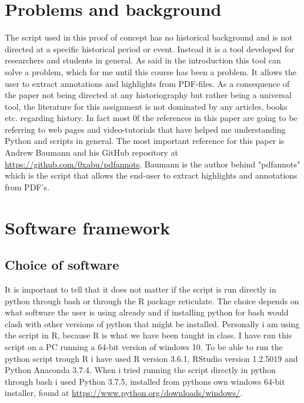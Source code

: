 \documentclass{article}
\begin{document}
\section{Problems and background}

The script used in this proof of concept has no historical background and is not directed at a specific historical period or event. Instead it is a tool developed for researchers and students in general. As said in the introduction this tool can solve a problem, which for me until this course has been a problem. It allows the user to extract annotations and highlights from PDF-files.
As a consequence of the paper not being directed at any historiography but rather being a universal tool, the literature for this assignment is not dominated by any articles, books etc. regarding history. In fact most 0f the references in this paper are going to be referring to web pages and video-tutorials that have helped me understanding Python and scripts in general.
The most important reference for this paper is Andrew Baumann and his GitHub repository at \url{https://github.com/0xabu/pdfannots}. Baumann is the author behind "pdfannots" which is the script that allows the end-user to extract highlights and annotations from PDF's.

\section{Software framework}
\subsection{Choice of software}
It is important to tell that it does not matter if the script is run directly in python through bash or through the R package reticulate. The choice depends on what software the user is using already and if installing python for bash would clash with other versions of python that might be installed. Personally i am using the script in R, because R is what we have been taught in class.
I have run this script on a PC running a 64-bit version of windows 10. To be able to run the python script trough R i have used R version 3.6.1, RStudio version 1.2.5019 and Python Anaconda 3.7.4.\newline
When i tried running the script directly in python through bash i used Python 3.7.5, installed from pythons own windows 64-bit installer, found at \url{https://www.python.org/downloads/windows/}. \newline
\end{document}
